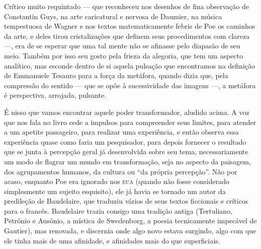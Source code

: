 Crítico muito requintado --- que reconheceu nos desenhos de fina
observação de Constantin Guys, na arte caricatural e nervosa de
Daumier, na música tempestuosa de Wagner e nos textos matematicamente
febris de Poe os caminhos da arte, e deles tirou cristalizações que
definem seus procedimentos com clareza ---, era de se esperar que uma tal
mente não se afinasse pelo diapasão de seu meio. Também por isso seu
gosto pela frieza da alegoria, que tem um aspecto analítico, mas
esconde dentro de si aquela pulsação que encontramos na definição de
Emmanuele Tesauro para a força da metáfora, quando dizia que, pela
compressão do sentido --- que se opõe à sucessividade das imagens ---, a
metáfora é perspectiva, arrojada, pulsante.

É nisso que vamos encontrar aquele poder transformador, aludido acima. A
voz que nos fala no livro cede a impulsos para compreender seus
limites, para atender a um apetite passageiro, para realizar uma
experiência, e então observa essa experiência quase como faria um
pesquisador, para depois fornecer o resultado que se junta à percepção
geral já desenvolvida sobre seu tema, necessariamente um modo de
flagrar um mundo em transformação, seja no aspecto da paisagem, dos
agrupamentos humanos, da cultura ou “da própria percepção”. Não          
por acaso, enquanto Poe era ignorado nos \textsc{eua} (quando não fosse 
considerado simplesmente um sujeito esquisito), ele já havia se tornado
um autor da predileção de Baudelaire, que traduziu vários de seus
textos ficcionais e críticos para o francês. Baudelaire trazia consigo
uma tradição antiga (Tertuliano, Petrônio e Ausônio, a mística de
Swedenborg, a poesia tecnicamente impecável de Gautier), mas renovada,
e discernia onde algo novo estava surgindo, algo com que ele tinha mais
de uma afinidade, e afinidades mais do que superficiais.

